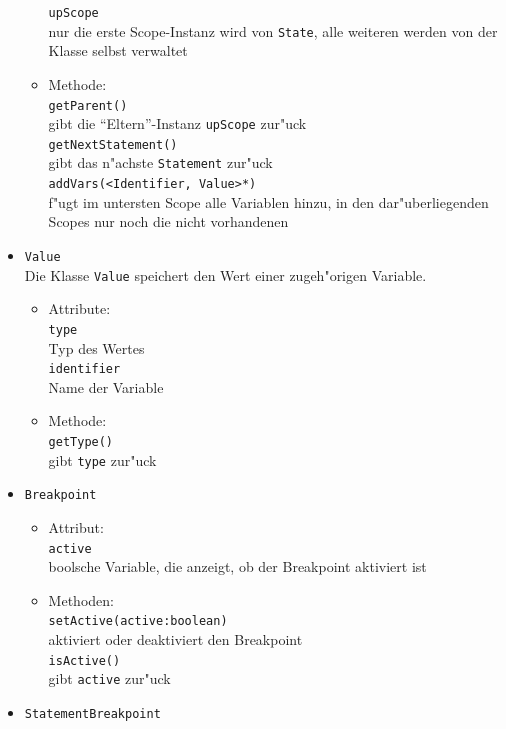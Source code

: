 \documentclass[10pt,a4paper,titlepage]{article}
\begin{document}
\begin{itemize}
\begin{itemize}
\texttt{upScope} \\
nur die erste Scope-Instanz wird von \texttt{State}, alle weiteren werden von der Klasse selbst verwaltet \\
\item Methode: \\
\texttt{getParent()} \\
gibt die "`Eltern"'-Instanz \texttt{upScope} zur"uck \\
\texttt{getNextStatement()} \\
gibt das n"achste \texttt{Statement} zur"uck \\
\texttt{addVars(<Identifier, Value>*)} \\
f"ugt im untersten Scope alle Variablen hinzu, in den dar"uberliegenden Scopes nur noch die nicht vorhandenen \\
\end{itemize}
\item \texttt{Value} \\
Die Klasse \texttt{Value} speichert den Wert einer zugeh"origen Variable. 
\begin{itemize}
\item Attribute: \\
\texttt{type} \\
Typ des Wertes \\
\texttt{identifier} \\
Name der Variable 
\item Methode: \\
\texttt{getType()} \\
gibt \texttt{type} zur"uck 
\end{itemize}
\item \texttt{Breakpoint}
\begin{itemize}
\item Attribut: \\
\texttt{active} \\
boolsche Variable, die anzeigt, ob der Breakpoint aktiviert ist \\
\item Methoden: \\
\texttt{setActive(active:boolean)} \\
aktiviert oder deaktiviert den Breakpoint \\
\texttt{isActive()} \\
gibt \texttt{active} zur"uck
\end{itemize}
\item \texttt{StatementBreakpoint} \\

\end{itemize}
\end{document}
